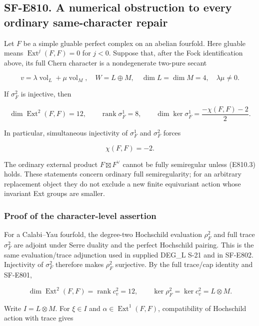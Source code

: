 \subsection{SF-E810. A numerical obstruction to every ordinary
same-character
repair}\label{SF-E810}

Let \(F\) be a simple gluable perfect complex on an abelian fourfold.
Here gluable means \(\operatorname{Ext}^{j}(F,F)=0\) for \(j<0\).
Suppose that, after the Fock identification above, its full Chern
character is a nondegenerate two-pure secant

\[
 v=\lambda\operatorname{vol}_L+\mu\operatorname{vol}_M,
 \quad W=L\oplus M,\quad\dim L=\dim M=4,\quad\lambda\mu\ne0.
 \tag{E810.1}
\]

If \(\sigma_F^2\) is injective, then

\[
 \dim\operatorname{Ext}^2(F,F)=12,\qquad
 \operatorname{rank}\sigma_F^1=8,\qquad
 \dim\ker\sigma_F^1=\frac{-\chi(F,F)-2}{2}.
 \tag{E810.2}
\]

In particular, simultaneous injectivity of \(\sigma_F^1\) and
\(\sigma_F^2\) forces

\[
 \chi(F,F)=-2.
 \tag{E810.3}
\]

The ordinary external product \(F\boxtimes F^\vee\) cannot be fully
semiregular unless (E810.3) holds. These statements concern ordinary
full semiregularity; for an arbitrary replacement object they do not
exclude a new finite equivariant action whose invariant Ext groups are
smaller.

\subsubsection{Proof of the character-level
assertion}\label{proof-of-the-character-level-assertion}

For a Calabi--Yau fourfold, the degree-two Hochschild evaluation
\(\rho_F^2\) and full trace \(\sigma_F^2\) are adjoint under Serre
duality and the perfect Hochschild pairing. This is the same
evaluation/trace adjunction used in supplied DEG\_L S-21 and in SF-E802.
Injectivity of \(\sigma_F^2\) therefore makes \(\rho_F^2\) surjective.
By the full trace/cap identity and SF-E801,

\[
 \dim\operatorname{Ext}^2(F,F)=\operatorname{rank}c_v^2=12,
 \qquad\ker\rho_F^2=\ker c_v^2=L\otimes M.
 \tag{E810.4}
\]

Write \(I=L\otimes M\). For \(\xi\in I\) and
\(\alpha\in\operatorname{Ext}^1(F,F)\), compatibility of Hochschild
action with trace gives

